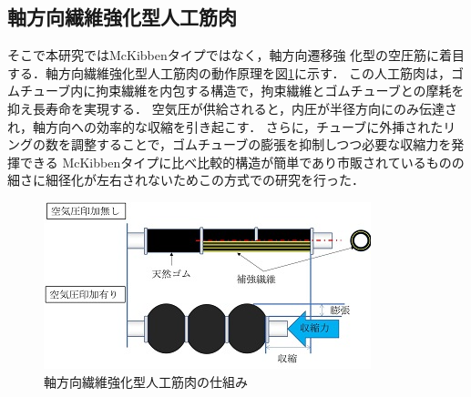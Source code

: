 \subsection{軸方向繊維強化型人工筋肉}
そこで本研究ではMcKibbenタイプではなく，軸方向遷移強
化型の空圧筋に着目する．軸方向繊維強化型人工筋肉の動作原理を図\ref{fig:siku}に示す．
この人工筋肉は，ゴムチューブ内に拘束繊維を内包する構造で，拘束繊維とゴムチューブとの摩耗を抑え長寿命を実現する．
空気圧が供給されると，内圧が半径方向にのみ伝達され，軸方向への効率的な収縮を引き起こす．
さらに，チューブに外挿されたリングの数を調整することで，ゴムチューブの膨張を抑制しつつ必要な収縮力を発揮できる\cite{3}
McKibbenタイプに比べ比較的構造が簡単であり市販されているものの細さに細径化が左右されないためこの方式での研究を行った．
\begin{figure}[h]
  \centering  %
  \includegraphics[scale=1]{pic/A.PNG}
  \caption{軸方向繊維強化型人工筋肉の仕組み\cite{4}}
  \label{fig:siku}
\end{figure}


